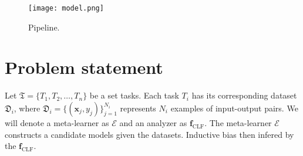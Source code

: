 \documentclass{article}
\begin{document}




    
\begin{figure}[hbt!]
    \centering
    \texttt{[image: model.png]}
    \caption{Pipeline.}
    \label{pipeline}
\end{figure}
\section{Problem statement}

Let \( \mathfrak{T} = \{T_1, T_2, \dots, T_n\} \) be a set tasks. Each task \( T_i \) has its corresponding dataset \( \mathfrak{D}_i \), where \( \mathfrak{D}_i = \{(\mathbf{x}_j, y_j) \}_{j=1}^{N_i} \) represents \( N_i \) examples of input-output pairs. We will denote a meta-learner as \( \mathcal{E} \) and an analyzer as \(\mathbf{f}_{\text{CLF}}\). The meta-learner \(\mathcal{E}\) constructs a candidate models given the datasets. Inductive bias then infered by the \(\mathbf{f}_{\text{CLF}}\).
\end{document}
